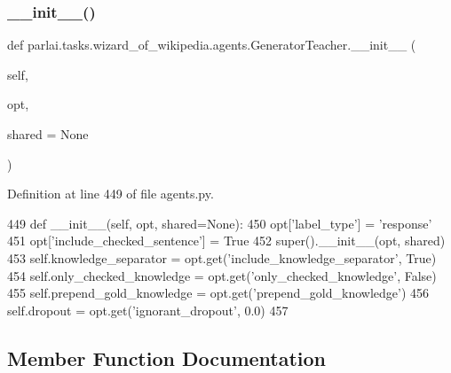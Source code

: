 \subsubsection{\texorpdfstring{\+\_\+\+\_\+init\+\_\+\+\_\+()}{\_\_init\_\_()}}
{\footnotesize\ttfamily def parlai.\+tasks.\+wizard\+\_\+of\+\_\+wikipedia.\+agents.\+Generator\+Teacher.\+\_\+\+\_\+init\+\_\+\+\_\+ (\begin{DoxyParamCaption}\item[{}]{self,  }\item[{}]{opt,  }\item[{}]{shared = {\ttfamily None} }\end{DoxyParamCaption})}



Definition at line 449 of file agents.\+py.


\begin{DoxyCode}
449     \textcolor{keyword}{def }\_\_init\_\_(self, opt, shared=None):
450         opt[\textcolor{stringliteral}{'label\_type'}] = \textcolor{stringliteral}{'response'}
451         opt[\textcolor{stringliteral}{'include\_checked\_sentence'}] = \textcolor{keyword}{True}
452         super().\_\_init\_\_(opt, shared)
453         self.knowledge\_separator = opt.get(\textcolor{stringliteral}{'include\_knowledge\_separator'}, \textcolor{keyword}{True})
454         self.only\_checked\_knowledge = opt.get(\textcolor{stringliteral}{'only\_checked\_knowledge'}, \textcolor{keyword}{False})
455         self.prepend\_gold\_knowledge = opt.get(\textcolor{stringliteral}{'prepend\_gold\_knowledge'})
456         self.dropout = opt.get(\textcolor{stringliteral}{'ignorant\_dropout'}, 0.0)
457 
\end{DoxyCode}


\subsection{Member Function Documentation}
\mbox{\label{classparlai_1_1tasks_1_1wizard__of__wikipedia_1_1agents_1_1GeneratorTeacher_ae23cc01ce296734fbb1d23d8cb3ca81f}} 
